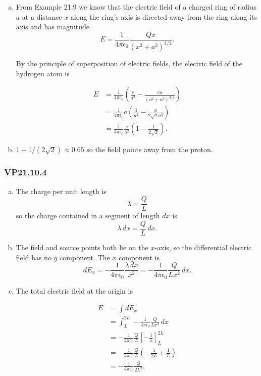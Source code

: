 \documentclass{article}
\begin{document}
\newcommand{\ke}{\frac{1}{4 \pi \epsilon_0}}

\begin{enumerate}[a)]
  \item From Example 21.9 we know that the electric field of a charged ring of radius $a$ at a distance $x$ along the ring's axis is directed away from the ring along its axis and has magnitude \[E = \frac{1}{4 \pi \epsilon_0} \frac{Qx}{(x^2 + a^2)^{3/2}}.\]

        By the principle of superposition of electric fields, the electric field of the hydrogen atom is

        \begin{align*}
          E & = \ke \left( \frac{e}{a^2} - \frac{ea}{(a^2 + a^2)^{3/2}} \right) \\
            & = \ke e \left( \frac{1}{a^2} - \frac{a}{2\sqrt{2}a^3} \right)     \\
            & = \ke \frac{e}{a^2} \left( 1 - \frac{1}{2\sqrt{2}} \right).
        \end{align*}

  \item $1 - 1/(2\sqrt{2}) \approx 0.65$ so the field points away from the proton.
\end{enumerate}

\subsubsection{VP21.10.4}

\begin{enumerate}[a)]
  \item The charge per unit length is \[\lambda = \frac{Q}{L}\] so the charge contained in a segment of length $dx$ is \[\lambda\,dx = \frac{Q}{L}\,dx.\]

  \item The field and source points both lie on the $x$-axis, so the differential electric field has no $y$ component. The $x$ component is \[dE_x = -\ke \frac{\lambda \, dx}{x^2} = -\ke \frac{Q}{Lx^2} \, dx.\]

  \item The total electric field at the origin is

        \begin{align*}
          E & = \int dE_x                                                   \\
            & = \int_L^{2L} -\ke \frac{Q}{Lx^2} \, dx                       \\
            & = -\ke \frac{Q}{L} \left[ -\frac{1}{x} \right]_L^{2L}         \\
            & = -\ke \frac{Q}{L} \left( -\frac{1}{2L} + \frac{1}{L} \right) \\
            & = -\ke \frac{Q}{2L^2}.
        \end{align*}
\end{enumerate}
\end{document}
